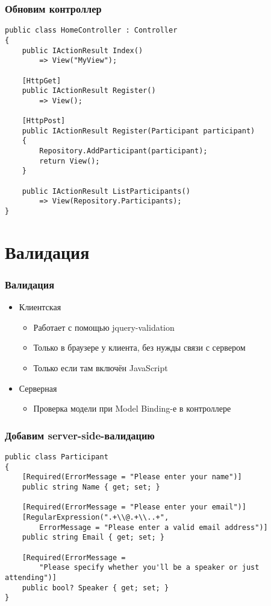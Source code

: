 \documentclass[xetex,mathserif,serif]{beamer}
\begin{document}
    \begin{frame}[fragile]
        \frametitle{Обновим контроллер}
        \begin{footnotesize}
            \begin{verbatim}
public class HomeController : Controller
{
    public IActionResult Index()
        => View("MyView");

    [HttpGet]
    public IActionResult Register()
        => View();

    [HttpPost]
    public IActionResult Register(Participant participant)
    {
        Repository.AddParticipant(participant);
        return View();
    }

    public IActionResult ListParticipants()
        => View(Repository.Participants);
}
            \end{verbatim}
        \end{footnotesize}
    \end{frame}

    \section{Валидация}

    \begin{frame}
        \frametitle{Валидация}
        \begin{itemize}
            \item Клиентская
            \begin{itemize}
                \item Работает с помощью jquery-validation
                \item Только в браузере у клиента, без нужды связи с сервером
                \item Только если там включён JavaScript
            \end{itemize}
            \item Серверная
            \begin{itemize}
                \item Проверка модели при Model Binding-е в контроллере
            \end{itemize}
        \end{itemize}
    \end{frame}

    \begin{frame}[fragile]
        \frametitle{Добавим server-side-валидацию}
        \begin{verbatim}
public class Participant
{
    [Required(ErrorMessage = "Please enter your name")]
    public string Name { get; set; }

    [Required(ErrorMessage = "Please enter your email")]
    [RegularExpression(".+\\@.+\\..+", 
        ErrorMessage = "Please enter a valid email address")]
    public string Email { get; set; }

    [Required(ErrorMessage = 
        "Please specify whether you'll be a speaker or just attending")]
    public bool? Speaker { get; set; }
}
        \end{verbatim}
    \end{frame}
\end{document}
